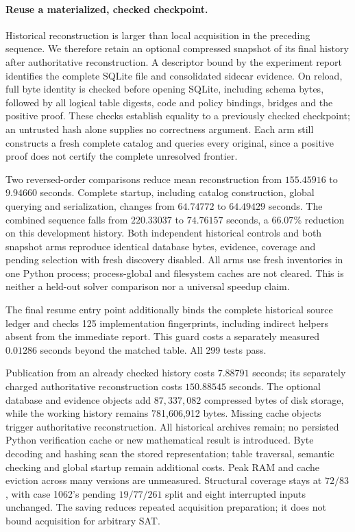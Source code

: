 \documentclass[11pt,a4paper]{article}
\numberwithin{equation}{section}
\theoremstyle{plain}
\theoremstyle{definition}
\theoremstyle{remark}
\begin{document}
\paragraph{Reuse a materialized, checked checkpoint.}
Historical reconstruction is larger than local acquisition in the preceding
sequence. We therefore retain an optional compressed snapshot of its final
history after authoritative reconstruction. A descriptor bound by the experiment
report identifies the complete SQLite file and consolidated sidecar evidence.
On reload, full byte identity is checked before opening SQLite, including schema
bytes, followed by all logical table digests, code and policy bindings, bridges
and the positive proof. These checks establish equality to a previously checked
checkpoint; an untrusted hash alone supplies no correctness argument. Each arm
still constructs a fresh complete catalog and queries every original, since a
positive proof does not certify the complete unresolved frontier.

Two reversed-order comparisons reduce mean reconstruction from
$155.45916$ to $9.94660$ seconds. Complete startup,
including catalog construction, global querying and serialization, changes from
$64.74772$ to $64.49429$ seconds. The combined sequence
falls from $220.33037$ to $74.76157$ seconds, a
$66.07\%$ reduction on this development history. Both independent
historical controls and both snapshot arms reproduce identical database bytes,
evidence, coverage and pending selection with fresh discovery disabled.
All arms use fresh inventories in one Python process; process-global and filesystem
caches are not cleared. This is neither a held-out solver comparison nor a
universal speedup claim.

The final resume entry point additionally binds the complete historical source
ledger and checks 125 implementation fingerprints, including indirect helpers
absent from the immediate report. This guard costs a separately measured
$0.01286$ seconds beyond the matched table. All 299 tests pass.

Publication from an already checked history costs $7.88791$ seconds; its
separately charged authoritative reconstruction costs
$150.88545$ seconds. The optional database and evidence
objects add $87{,}337{,}082$ compressed bytes of disk storage, while the working
history remains 781,606,912 bytes. Missing cache objects trigger authoritative
reconstruction. All historical archives remain; no persisted Python verification
cache or new mathematical result is introduced. Byte decoding and hashing scan
the stored representation; table traversal, semantic checking and global startup
remain additional costs. Peak RAM and cache eviction across many versions are
unmeasured. Structural coverage stays at $72/83$, with case 1062's pending
$19/77/261$ split and eight interrupted inputs unchanged. The saving reduces
repeated acquisition preparation; it does not bound acquisition for arbitrary SAT.
\end{document}
